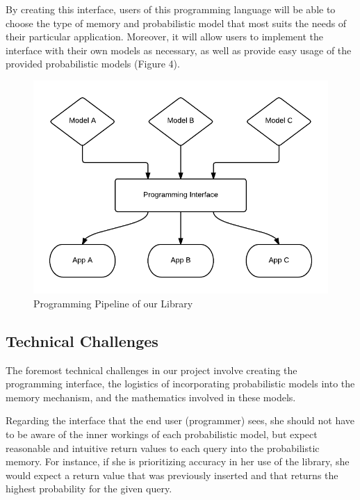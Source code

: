 \documentclass{sig-alternate}
\begin{document}
By creating this interface, users of this programming language will be able to
choose the type of memory and probabilistic model that most suits the needs of their particular
application. Moreover, it will allow users to implement the interface with their own models as necessary, 
as well as provide easy usage of the provided probabilistic models (Figure 4).

\begin{figure}[H]
	\begin{center}
		\includegraphics[width=1\linewidth]{block2}
	\end{center}
	\vspace{-12pt}
	\caption{Programming Pipeline of our Library}
	\label{fig:block2}
\end{figure}

\subsection{Technical Challenges}
\label{subsec:tech_challenges}
The foremost technical challenges in our project involve creating the programming interface,
the logistics of incorporating probabilistic models into the memory mechanism, and
the mathematics involved in these models.

Regarding the interface that the end user (programmer) sees, she should not have to be aware of 
the inner workings of each probabilistic model, but expect reasonable and intuitive return values
to each query into the probabilistic memory. For instance, if she is prioritizing accuracy 
in her use of the library, she would expect a return value that was previously inserted and that 
returns the highest probability for the given query.
\end{document}
